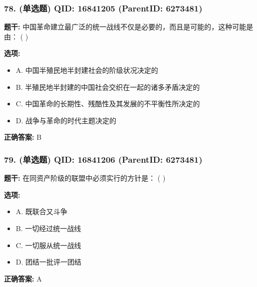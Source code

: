 \documentclass[12pt,UTF8]{ctexart}
\begin{document}
\subsubsection*{78. (单选题) \small QID: 16841205 (ParentID: 6273481)}

\textbf{题干:}
中国革命建立最广泛的统一战线不仅是必要的，而且是可能的，这种可能是由： ( )



\textbf{选项:}
\begin{itemize}[leftmargin=*]

  \item A. 中国半殖民地半封建社会的阶级状况决定的

  \item B. 半殖民地半封建的中国社会交织在一起的诸多矛盾决定的

  \item C. 中国革命的长期性、残酷性及其发展的不平衡性所决定的

  \item D. 战争与革命的时代主题决定的

\end{itemize}

\textbf{正确答案:}
B

\vspace{0.3em}\hrulefill\vspace{0.7em}

\subsubsection*{79. (单选题) \small QID: 16841206 (ParentID: 6273481)}

\textbf{题干:}
在同资产阶级的联盟中必须实行的方针是： ( )



\textbf{选项:}
\begin{itemize}[leftmargin=*]

  \item A. 既联合又斗争

  \item B. 一切经过统一战线

  \item C. 一切服从统一战线

  \item D. 团结一批评一团结

\end{itemize}

\textbf{正确答案:}
A

\vspace{0.3em}\hrulefill\vspace{0.7em}
\end{document}

